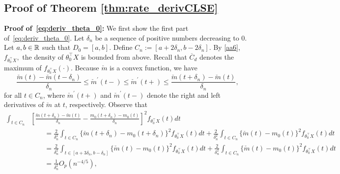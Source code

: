 \subsection{Proof of Theorem \ref{thm:rate_derivCLSE}}\label{proof:DerivCLSE}
\textbf{Proof of~\eqref{eq:deriv_theta_0}:}
We first show  the first part of~\eqref{eq:deriv_theta_0}. Let $\delta_n$ be a sequence of positive numbers decreasing to $0$. Let $a,b \in \mathbb{R}$ such that $D_0 = [a,b]$. Define $C_n := [a + 2\delta_n, b - 2\delta_n]$.  By \ref{aa6}, $f_{\theta_0^\top X},$ the density of $\theta^\top_0X$ is bounded from above. Recall that $\overline{C}_d$ denotes the maximum of $f_{\theta_0^{\top}X}(\cdot)$. Because $\check{m}$ is a convex function,  we have
\[ \frac{\check{m}(t)- \check{m}(t-\delta_n)}{ \delta_n} \le \check{m}^\prime(t-) \le \check{m}^\prime(t+)  \le \frac{\check{m}(t+\delta_n)- \check{m}(t)}{ \delta_n},\]
for all $t\in C_n$, where $\check{m}^\prime(t+)$ and $\check{m}^\prime(t-)$ denote the right and left derivatives of $\check{m}$ at $t$, respectively. Observe that
\begin{align}
\int_{t\in C_n} &\left[ \frac{\check{m}(t+\delta_n)- \check{m}(t)}{ \delta_n}- \frac{m_0(t+\delta_n)- m_0(t)}{ \delta_n}\right]^2 f_{\theta_0^\top X}(t)dt \nonumber\\
&\qquad=\frac{2}{\delta_n^2}\int_{t\in C_n}\{\check{m}(t + \delta_n) - {m}_0(t + \delta_n)\}^2 f_{\theta_0^\top X}(t)dt + \frac{2}{\delta_n^2}\int_{t\in C_n}\{\check{m}(t) - m_0(t)\}^2 f_{\theta_0^\top X}(t)dt\nonumber\\
&\qquad=\frac{2}{\delta_n^2}\int_{t\in [a + 3\delta_n, b - \delta_n]}\{\check{m}(t) - m_0(t)\}^2 f_{\theta_0^\top X}(t) dt  + \frac{2}{\delta_n^2}\int_{t\in C_n}\{\check{m}(t) - m_0(t)\}^2 f_{\theta_0^\top X}(t) dt\nonumber\\
&\qquad= \frac{1}{\delta_n^2} O_p(n^{-4/5}),\label{eq:int_uppper_bound}
\end{align}
